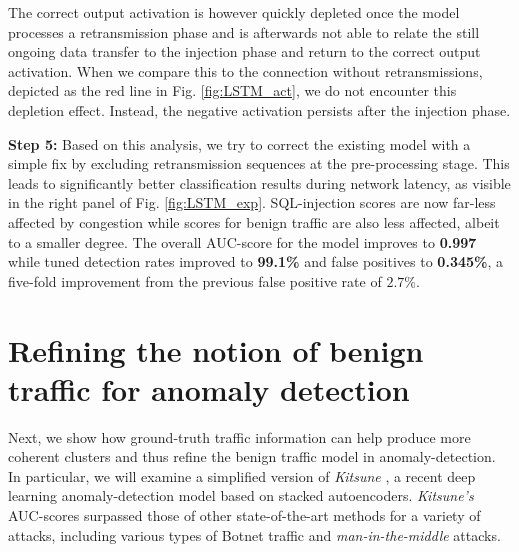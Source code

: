 \documentclass[conference]{IEEEtran}
\begin{document}
The correct output activation is however quickly depleted once the model processes a retransmission phase and is afterwards not able to relate the still ongoing data transfer to the injection phase and return to the correct output activation. When we compare this to the connection without retransmissions, depicted as the red line in Fig. \ref{fig:LSTM_act}, we do not encounter this depletion effect. Instead, the negative activation persists after the injection phase.

\textbf{Step 5:} Based on this analysis, we try to correct the existing model with a simple fix by excluding retransmission sequences at the pre-processing stage. This leads to significantly better classification results during network latency, as visible in the right panel of Fig. \ref{fig:LSTM_exp}. SQL-injection scores are now far-less affected by congestion while scores for benign traffic are also less affected, albeit to a smaller degree.
The overall AUC-score for the model improves to \textbf{0.997} while tuned detection rates improved to \textbf{99.1\%} and false positives to \textbf{0.345\%}, a five-fold improvement from the previous false positive rate of $2.7\%$. 

\section{Refining the notion of benign traffic for anomaly detection}\label{Sec:Refining}

Next, we show how ground-truth traffic information can help produce more coherent clusters and thus refine the benign traffic model in anomaly-detection. In particular, we will examine a 
simplified version of \textit{Kitsune} \cite{mirsky2018kitsune}, a recent deep learning anomaly-detection model based on stacked autoencoders. \textit{Kitsune's} AUC-scores surpassed those of other state-of-the-art methods for a variety of attacks, including various types of Botnet traffic and \textit{man-in-the-middle} attacks.
\end{document}
